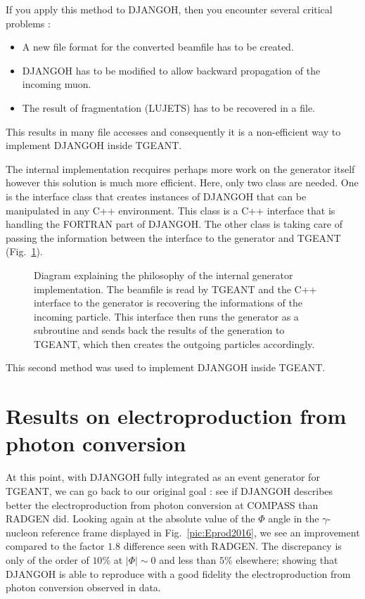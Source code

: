 If you apply this method to DJANGOH, then you encounter several critical problems :
\begin{itemize}
\item A new file format for the converted beamfile has to be created.
\item DJANGOH has to be modified to allow backward propagation of the incoming muon.
\item The result of fragmentation (LUJETS) has to be recovered in a file.
\end{itemize}
This results in many file accesses and consequently it is a non-efficient way to
implement DJANGOH inside TGEANT.

The internal implementation recquires perhaps more work on the generator itself however
this solution is much more efficient. Here, only two class are needed. One is the
interface class that creates instances of DJANGOH that can be manipulated in any C++
environment. This class is a C++ interface that is handling the FORTRAN part of DJANGOH.
The other class is taking care of passing the information between the interface to the
generator and TGEANT (Fig.~\ref{fig:pythiaex}).

\begin{figure}[!htb]
\centerline{}
\caption{Diagram explaining the philosophy of the internal generator implementation.
The beamfile is read by TGEANT and the C++ interface to the generator is recovering the
informations of the incoming particle. This interface then runs the generator as a subroutine
and sends back the results of the generation to TGEANT, which then creates the outgoing particles
accordingly.}\label{fig:pythiaex}
\end{figure}

This second method was used to implement DJANGOH inside TGEANT.


\section{Results on electroproduction from photon conversion}

At this point, with DJANGOH fully integrated as an event generator for TGEANT, we can go back to our original goal : see if DJANGOH describes better the electroproduction from photon conversion at COMPASS than RADGEN did. Looking again at the absolute value of the $\Phi$ angle in the $\gamma$-nucleon reference frame displayed in Fig.~\ref{pic:Eprod2016}, we see an improvement compared to the factor $1.8$ difference seen with RADGEN. The discrepancy is only of the order of $10$\% at $|\Phi| \sim 0$ and less than $5$\% elsewhere; showing that DJANGOH is able to reproduce with a good fidelity the electroproduction from photon conversion observed in data.

